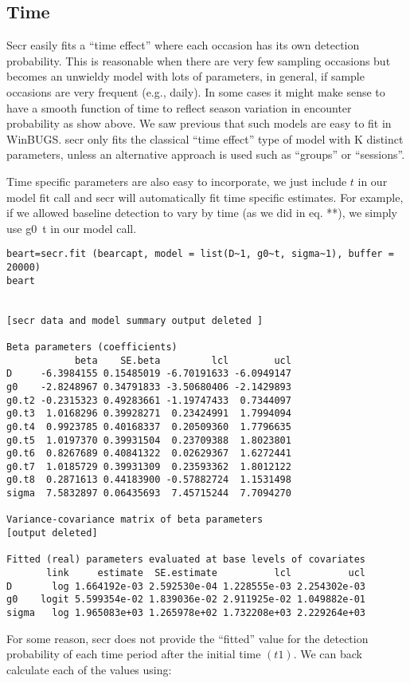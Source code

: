 \subsection{Time}
Secr easily fits a ``time effect'' where each occasion has its own detection probability. This is reasonable when there are very few sampling occasions but becomes an unwieldy model with lots of parameters, in general, if sample occasions are very frequent (e.g., daily). In some cases it might make sense to have a smooth function of time to reflect season variation in encounter probability as show above. We saw previous that such models are easy to fit in WinBUGS.  secr only fits the classical ``time effect'' type of model with K distinct parameters, unless an alternative approach is used such as ``groups'' or ``sessions''.

Time specific parameters are also easy to incorporate, we just include $t$ in our model fit call and secr will automatically fit time specific estimates.  For example, if we allowed baseline detection to vary by time (as we did in eq. **), we simply use g0~t in our model call.  
\begin{verbatim}
beart=secr.fit (bearcapt, model = list(D~1, g0~t, sigma~1), buffer = 20000) 
beart


[secr data and model summary output deleted ]

Beta parameters (coefficients) 
            beta    SE.beta         lcl        ucl
D     -6.3984155 0.15485019 -6.70191633 -6.0949147
g0    -2.8248967 0.34791833 -3.50680406 -2.1429893
g0.t2 -0.2315323 0.49283661 -1.19747433  0.7344097
g0.t3  1.0168296 0.39928271  0.23424991  1.7994094
g0.t4  0.9923785 0.40168337  0.20509360  1.7796635
g0.t5  1.0197370 0.39931504  0.23709388  1.8023801
g0.t6  0.8267689 0.40841322  0.02629367  1.6272441
g0.t7  1.0185729 0.39931309  0.23593362  1.8012122
g0.t8  0.2871613 0.44183900 -0.57882724  1.1531498
sigma  7.5832897 0.06435693  7.45715244  7.7094270

Variance-covariance matrix of beta parameters 
[output deleted]

Fitted (real) parameters evaluated at base levels of covariates 
       link     estimate  SE.estimate          lcl          ucl
D       log 1.664192e-03 2.592530e-04 1.228555e-03 2.254302e-03
g0    logit 5.599354e-02 1.839036e-02 2.911925e-02 1.049882e-01
sigma   log 1.965083e+03 1.265978e+02 1.732208e+03 2.229264e+03

\end{verbatim}

For some reason, secr does not provide the ``fitted'' value for the
detection probability of each time period after the initial time
$(t1)$.   We can back calculate each of the values using:

